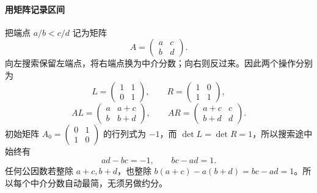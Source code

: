 \documentclass[lang=cn,a4paper,fontset=none,zihao=false,10pt,openany,twoside]{beautybook}
\numberwithin{algorithm}{chapter}
\begin{document}
\paragraph{用矩阵记录区间}
把端点 $a/b<c/d$ 记为矩阵
\[
 A=\begin{pmatrix}a&c\\b&d\end{pmatrix}.
\]
向左搜索保留左端点，将右端点换为中介分数；向右则反过来。因此两个操作分别为
\[
 L=\begin{pmatrix}1&1\\0&1\end{pmatrix},\qquad
 R=\begin{pmatrix}1&0\\1&1\end{pmatrix},
\]
\[
 AL=\begin{pmatrix}a&a+c\\b&b+d\end{pmatrix},\qquad
 AR=\begin{pmatrix}a+c&c\\b+d&d\end{pmatrix}.
\]
初始矩阵 $A_0=\begin{pmatrix}0&1\\1&0\end{pmatrix}$ 的行列式为 $-1$，而 $\det L=\det R=1$，所以搜索途中始终有
\[
 ad-bc=-1,\qquad bc-ad=1.
\]
任何公因数若整除 $a+c,b+d$，也整除 $b(a+c)-a(b+d)=bc-ad=1$。所以每个中介分数自动最简，无须另做约分。
\end{document}
